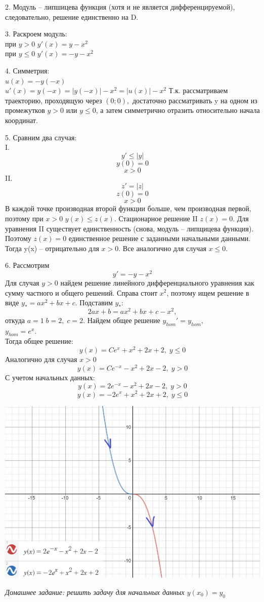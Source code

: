 \documentclass[10pt]{report}
\begin{document}
2. Модуль -- липшицева функция (хотя и не является дифференцируемой), следовательно, решение единственно на D.

3. Раскроем модуль:\\
при $y>0$ $ y'(x) = y-x^2$\\
при $y\leq 0$ $y'(x)=-y-x^2$

4. Симметрия:\\
$ u(x) = -y(-x)$\\
$u'(x) = y(-x) = |y(-x)|-x^2=|u(x)|-x^2$
Т.к. рассматриваем траекторию, проходящую через $(0;0),$ достаточно рассматривать y на одном из промежутков $y>0$ или $y\leq 0$, а затем симметрично отразить относительно начала координат.

5. Сравним два случая:\\
I. \[y' \leq |y|\]
\[y(0)=0\]
\[x>0\]
II.  \[z' = |z|\]
\[z(0)=0\]
\[x>0\]
В каждой точке производная второй функции больше, чем производная первой, поэтому при $x>0$ $y(x) \leq z(x)$. Стационарное решение II $z(x)=0$. Для уравнения II существует единственность (снова, модуль -- липщицева функция). Поэтому  $z(x)=0$ единственное решение с заданными начальными данными. Тогда 
y(x) -- отрицательно для $x>0$. Все аналогично для случая $x\leq 0$.

6. Рассмотрим \[y'=-y-x^2\]
Для случая $y>0$ найдем решение линейного дифференциального уравнения как сумму частного и общего решений. Справа стоит $x^2$, поэтому ищем решение в виде $y_{*}=ax^2+bx+c$. Подставим $y_{*}$:\\
\[2ax+b=ax^2+bx+c-x^2,\]
откуда $a=1 \; b=2, \; c = 2$. 
Найдем общее решение $y_{hom}' = y_{hom}, $\\$ y_{hom}=e^{x}$.\\
Тогда общее решение:
\[ y(x) = Ce^{x}+x^2+2x+2, \; y\leq 0\]
Аналогично для случая $x>0$
\[ y(x) = Ce^{-x}-x^2+2x-2, \; y>0\]
С учетом начальных данных:
\[ y(x) = 2e^{-x}-x^2+2x-2, \; y>0\]
\[ y(x) = -2e^{x}+x^2+2x+2, \; y\leq 0\]
\begin{center}
{\includegraphics[scale=0.4]{graph5.3.png}} 
\end{center}
\textit{Домашнее задание: решить задачу для начальных данных $y(x_0) = y_0$}
\end{document}
